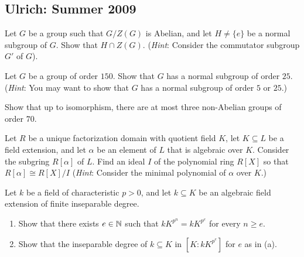 \subsection{Ulrich: Summer 2009}
\setcounter{exercise}{0}
\setcounter{equation}{0}

\begin{problem}
  Let \(G\) be a group such that \(G/Z(G)\) is Abelian, and let
  \(H\neq\{e\}\) be a normal subgroup of \(G\). Show that \(H\cap
  Z(G)\). (\emph{Hint}: Consider  the commutator subgroup \(G'\) of
  \(G\)).
\end{problem}
\begin{solution}
\end{solution}

\begin{problem}
  Let \(G\) be a group of order \(150\). Show that \(G\) has a normal
  subgroup of order \(25\). (\emph{Hint}: You may want to show that \(G\)
  has a normal subgroup of order \(5\) or \(25\).)
\end{problem}
\begin{solution}
\end{solution}

\begin{problem}
  Show that up to isomorphism, there are at most three non-Abelian groups
  of order \(70\).
\end{problem}
\begin{solution}
\end{solution}

\begin{problem}
  Let \(R\) be a unique factorization domain with quotient field \(K\), let
  \(K\subseteq L\) be a field extension, and let \(\alpha\) be an element
  of \(L\) that is algebraic over \(K\). Consider the subgring
  \(R[\alpha]\) of \(L\). Find an ideal \(I\) of the polynomial ring
  \(R[X]\) so that \(R[\alpha]\cong R[X]/I\) (\emph{Hint}: Consider the
  minimal polynomial of \(\alpha\) over \(K\).)
\end{problem}
\begin{solution}
\end{solution}

\begin{problem}
  Let \(k\) be a field of characteristic \(p>0\), and let \(k\subseteq K\)
  be an algebraic field extension of finite inseparable degree.
  \begin{enumerate}[label=(\alph*)]
  \item Show that there exists \(e\in\mathbb{N}\) such that \(kK^{p^n}=kK^{p^e}\)
    for every \(n\geq e\).
  \item Show that the inseparable degree of \(k\subseteq K\) in
    \([K:kK^{p^e}]\) for \(e\) as in (a).
  \end{enumerate}
\end{problem}
\begin{solution}
\end{solution}

